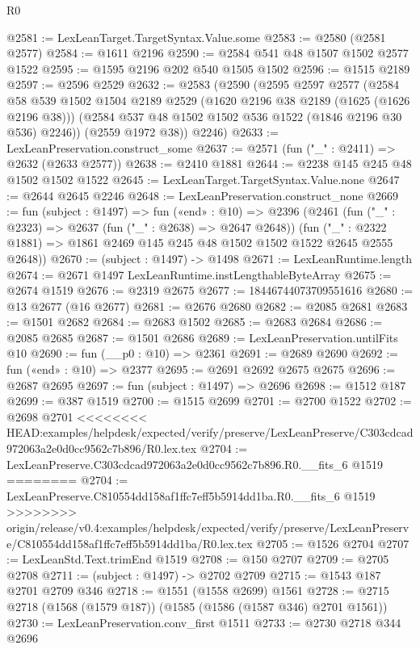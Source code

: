 \begin{lexlean}{R0}
\begin{coremodule}
{{{{{{{{{{{{{{{{{{{{{{{{{{{{{{{{{{{{{{{{{{{{{{{{{{{{{{{{{{{{{{{{{{{{{{{{{@2581 := LexLeanTarget.TargetSyntax.Value.some
@2583 := @2580 (@2581 @2577)
@2584 := @1611 @2196
@2590 := @2584 @541 @48 @1507 @1502 @2577 @1522
@2595 := @1595 @2196 @202 @540 @1505 @1502
@2596 := @1515 @2189
@2597 := @2596 @2529
@2632 := @2583
    (@2590
      (@2595
        @2597
        @2577
        (@2584
          @58
          @539
          @1502
          @1504
          @2189
          @2529
          (@1620 @2196 @38 @2189 (@1625 (@1626 @2196 @38)))
          (@2584 @537 @48 @1502 @1502 @536 @1522 (@1846 @2196 @30 @536) @2246))
        (@2559 @1972 @38))
      @2246)
@2633 := LexLeanPreservation.construct_some
@2637 := @2571 (fun ("_" : @2411) => @2632 (@2633 @2577))
@2638 := @2410 @1881
@2644 := @2238 @145 @245 @48 @1502 @1502 @1522
@2645 := LexLeanTarget.TargetSyntax.Value.none
@2647 := @2644 @2645 @2246
@2648 := LexLeanPreservation.construct_none
@2669 := fun (subject : @1497) =>
  fun («end» : @10) =>
  @2396
    (@2461
      (fun ("_" : @2323) => @2637 (fun ("_" : @2638) => @2647 @2648))
      (fun ("_" : @2322 @1881) => @1861 @2469 @145 @245 @48 @1502 @1502 @1522 @2645 @2555 @2648))
@2670 := (subject : @1497) -> @1498
@2671 := LexLeanRuntime.length
@2674 := @2671 @1497 LexLeanRuntime.instLengthableByteArray
@2675 := @2674 @1519
@2676 := @2319 @2675
@2677 := 18446744073709551616
@2680 := @13 @2677 (@16 @2677)
@2681 := @2676 @2680
@2682 := @2085 @2681
@2683 := @1501 @2682
@2684 := @2683 @1502
@2685 := @2683 @2684
@2686 := @2085 @2685
@2687 := @1501 @2686
@2689 := LexLeanPreservation.untilFits @10
@2690 := fun (__p0 : @10) => @2361
@2691 := @2689 @2690
@2692 := fun («end» : @10) => @2377
@2695 := @2691 @2692 @2675 @2675
@2696 := @2687 @2695
@2697 := fun (subject : @1497) => @2696
@2698 := @1512 @187
@2699 := @387 @1519
@2700 := @1515 @2699
@2701 := @2700 @1522
@2702 := @2698 @2701
<<<<<<<< HEAD:examples/helpdesk/expected/verify/preserve/LexLeanPreserve/C303cdcad972063a2e0d0cc9562c7b896/R0.lex.tex
@2704 := LexLeanPreserve.C303cdcad972063a2e0d0cc9562c7b896.R0.__fits_6 @1519
========
@2704 := LexLeanPreserve.C810554dd158af1ffc7eff5b5914dd1ba.R0.__fits_6 @1519
>>>>>>>> origin/release/v0.4:examples/helpdesk/expected/verify/preserve/LexLeanPreserve/C810554dd158af1ffc7eff5b5914dd1ba/R0.lex.tex
@2705 := @1526 @2704
@2707 := LexLeanStd.Text.trimEnd @1519
@2708 := @150 @2707
@2709 := @2705 @2708
@2711 := (subject : @1497) -> @2702 @2709
@2715 := @1543 @187 @2701 @2709 @346
@2718 := @1551 (@1558 @2699) @1561
@2728 := @2715 @2718 (@1568 (@1579 @187)) (@1585 (@1586 (@1587 @346) @2701 @1561))
@2730 := LexLeanPreservation.conv_first @1511
@2733 := @2730 @2718 @344 @2696
}}}}}}}}}}}}}}}}}}}}}}}}}}}}}}}}}}}}}}}}}}}}}}}}}}}}}}}}}}}}}}}}}}}}}}}}}
\end{coremodule}
\end{lexlean}

